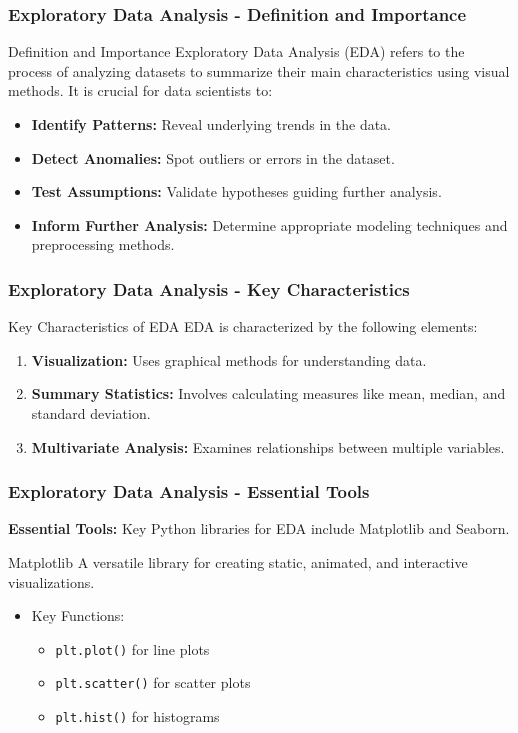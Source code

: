 \documentclass{beamer}
\begin{document}
\begin{frame}[fragile]
    \frametitle{Exploratory Data Analysis - Definition and Importance}
    \begin{block}{Definition and Importance}
        Exploratory Data Analysis (EDA) refers to the process of analyzing datasets to summarize their main characteristics using visual methods. It is crucial for data scientists to:
    \end{block}
    \begin{itemize}
        \item \textbf{Identify Patterns:} Reveal underlying trends in the data.
        \item \textbf{Detect Anomalies:} Spot outliers or errors in the dataset.
        \item \textbf{Test Assumptions:} Validate hypotheses guiding further analysis.
        \item \textbf{Inform Further Analysis:} Determine appropriate modeling techniques and preprocessing methods.
    \end{itemize}
\end{frame}

\begin{frame}[fragile]
    \frametitle{Exploratory Data Analysis - Key Characteristics}
    \begin{block}{Key Characteristics of EDA}
        EDA is characterized by the following elements:
    \end{block}
    \begin{enumerate}
        \item \textbf{Visualization:} Uses graphical methods for understanding data.
        \item \textbf{Summary Statistics:} Involves calculating measures like mean, median, and standard deviation.
        \item \textbf{Multivariate Analysis:} Examines relationships between multiple variables.
    \end{enumerate}
\end{frame}

\begin{frame}[fragile]
    \frametitle{Exploratory Data Analysis - Essential Tools}
    \textbf{Essential Tools:} Key Python libraries for EDA include Matplotlib and Seaborn.
    
    \begin{block}{Matplotlib}
        A versatile library for creating static, animated, and interactive visualizations.
        \begin{itemize}
            \item Key Functions:
            \begin{itemize}
                \item \texttt{plt.plot()} for line plots
                \item \texttt{plt.scatter()} for scatter plots
                \item \texttt{plt.hist()} for histograms
            \end{itemize}
        \end{itemize}
    \end{block}
\end{frame}
\end{document}
